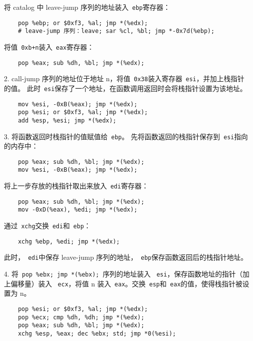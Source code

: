\documentclass{article}
\begin{document}
将 catalog 中 leave-jump 序列的地址装入\verb+ ebp+寄存器：
\begin{verbatim}
    pop %ebp; or $0xf3, %al; jmp *(%edx);
    # leave-jump 序列：leave; sar %cl, %bl; jmp *-0x7d(%ebp);
\end{verbatim}

将值\verb| 0xb+n|装入\verb+ eax+寄存器：
\begin{verbatim}
    pop %eax; sub %dh, %bl; jmp *(%edx);
\end{verbatim}

2. call-jump 序列的地址位于地址 n，将值\verb+ 0x38+装入寄存器\verb+ esi+，并加上栈指针的值。
此时\verb+ esi+保存了一个地址，在函数调用返回时会将栈指针设置为该地址。
\begin{verbatim}
    mov %esi, -0xB(%eax); jmp *(%edx);
    pop %esi; or $0xf3, %al; jmp *(%edx);
    add %esp, %esi; jmp *(%edx);
\end{verbatim}

3. 将函数返回时栈指针的值赋值给\verb+ ebp+。
先将函数返回的栈指针保存到\verb+ esi+指向的内存中：
\begin{verbatim}
    pop %eax; sub %dh, %bl; jmp *(%edx);
    mov %esi, -0xB(%eax); jmp *(%edx);
\end{verbatim}

将上一步存放的栈指针取出来放入\verb+ edi+寄存器：
\begin{verbatim}
    pop %eax; sub %dh, %bl; jmp *(%edx);
    mov -0xD(%eax), %edi; jmp *(%edx);
\end{verbatim}

通过\verb+ xchg+交换\verb+ edi+和\verb+ ebp+：
\begin{verbatim}
    xchg %ebp, %edi; jmp *(%edx);
\end{verbatim}

此时，\verb+ edi+中保存 leave-jump 序列的地址，\verb+ ebp+保存函数返回后的栈指针地址。

4. 将\verb+ pop %ebx; jmp *(%ebx); +序列的地址装入 \verb+ esi+，保存函数地址的指针（加上偏移量）装入 \verb+ ecx+，将值 n 装入\verb+ eax+。交换\verb+ esp+和\verb+ eax+的值，使得栈指针被设置为 n。
\begin{verbatim}
    pop %esi; or $0xf3, %al; jmp *(%edx);
    pop %ecx; cmp %dh, %dh; jmp *(%edx);
    pop %eax; sub %dh, %bl; jmp *(%edx);
    xchg %esp, %eax; dec %ebx; std; jmp *0(%esi);
\end{verbatim}
\end{document}
